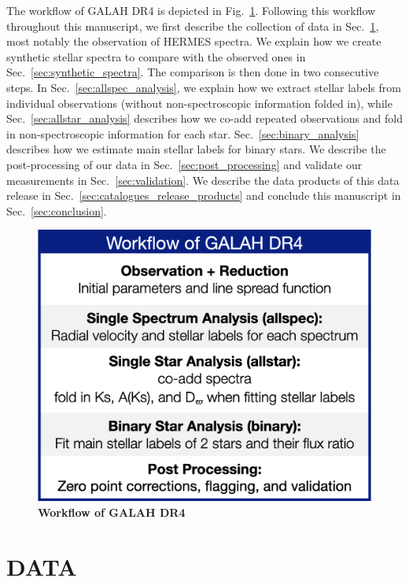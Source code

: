 \documentclass[
  journal=pasa,
  manuscript=research-paper, %
  year=2023,
  volume=37
]{cup-journal}
\begin{document}
The workflow of GALAH DR4 is depicted in Fig.~\ref{fig:workflow_galah_dr4}. Following this workflow throughout this manuscript, we first describe the collection of data in Sec.~\ref{sec:data}, most notably the observation of HERMES spectra. We explain how we create synthetic stellar spectra to compare with the observed ones in Sec.~\ref{sec:synthetic_spectra}. The comparison is then done in two consecutive steps. In Sec.~\ref{sec:allspec_analysis}, we explain how we extract stellar labels from individual observations (without non-spectroscopic information folded in), while Sec.~\ref{sec:allstar_analysis} describes how we co-add repeated observations and fold in non-spectroscopic information for each star. Sec.~\ref{sec:binary_analysis} describes how we estimate main stellar labels for binary stars. We describe the post-processing of our data in Sec.~\ref{sec:post_processing} and validate our measurements in Sec.~\ref{sec:validation}. We describe the data products of this data release in Sec.~\ref{sec:catalogues_release_products} and conclude this manuscript in Sec.~\ref{sec:conclusion}.

\begin{figure}[hbt]
 \centering
 \includegraphics[width=\textwidth]{figures/workflow_galah_dr4.png}
 \caption{\textbf{Workflow of GALAH DR4}}
 \label{fig:workflow_galah_dr4}
\end{figure}

\newpage
\section{DATA}
\label{sec:data}
\end{document}
